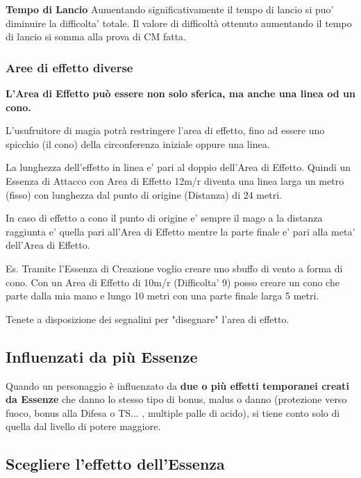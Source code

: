\documentclass[a4paper,11pt,twoside,openany]{book}
\begin{document}
\textbf{Tempo di Lancio}  
Aumentando significativamente il tempo di lancio  si puo' diminuire la difficolta' totale.
Il valore di difficoltà ottenuto aumentando il tempo di lancio si somma alla prova di CM fatta.

\subsubsection{Aree di effetto diverse}

\label{aree-di-effetto-diverse}

\textbf{L'Area di Effetto può essere non solo sferica, ma anche una linea od un cono.}

L'usufruitore di magia potrà restringere l'area di effetto, fino ad essere uno spicchio (il cono) della circonferenza iniziale oppure una linea.

La lunghezza dell'effetto in linea e' pari al doppio dell'Area di Effetto. Quindi un Essenza di Attacco con Area di Effetto 12m/r diventa una linea larga un metro (fisso) con lunghezza dal punto di origine (Distanza) di 24 metri.

In caso di effetto a cono il punto di origine e' sempre il mago a la distanza raggiunta e' quella pari all'Area di Effetto mentre la parte finale e' pari alla meta' dell'Area di Effetto.

Es. Tramite l'Essenza di Creazione voglio creare uno sbuffo di vento a forma di cono.
Con un Area di Effetto di 10m/r (Difficolta' 9) posso creare un cono che parte dalla mia mano e lungo 10 metri con una parte finale larga 5 metri.

Tenete a disposizione dei segnalini per "disegnare" l'area di effetto.

\subsection{Influenzati da più Essenze}

\label{influenzati-da-piu-essenze}

Quando un personaggio è influenzato da \textbf{due o più effetti temporanei creati da Essenze} che danno lo stesso tipo di bonus, malus o danno (protezione verso fuoco, bonus alla Difesa o TS... , multiple palle di acido), si tiene conto solo di quella dal livello di potere maggiore.

\subsection{Scegliere l'effetto dell'Essenza}
\end{document}
